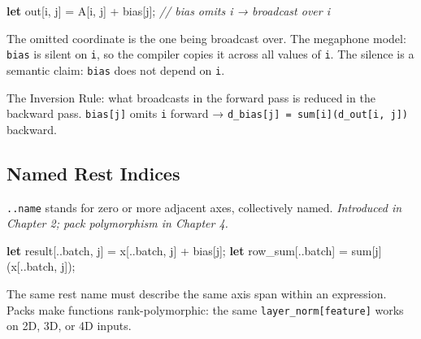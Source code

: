 \documentclass[11pt,titlepage]{article}
\newenvironment{Shaded}{}{}
\newcommand{\CommentTok}[1]{\textcolor[rgb]{0.38,0.63,0.69}{\textit{#1}}}
\newcommand{\KeywordTok}[1]{\textcolor[rgb]{0.00,0.44,0.13}{\textbf{#1}}}
\newcommand{\NormalTok}[1]{#1}
\newcommand{\OperatorTok}[1]{\textcolor[rgb]{0.40,0.40,0.40}{#1}}
\begin{document}
\begin{Shaded}
\begin{Highlighting}[]
\KeywordTok{let}\NormalTok{ out}\OperatorTok{[}\NormalTok{i, j}\OperatorTok{]}\NormalTok{ = A}\OperatorTok{[}\NormalTok{i, j}\OperatorTok{]}\NormalTok{ + bias}\OperatorTok{[}\NormalTok{j}\OperatorTok{]}\NormalTok{;   }\CommentTok{// bias omits i → broadcast over i}
\end{Highlighting}
\end{Shaded}

The omitted coordinate is the one being broadcast over. The megaphone
model: \texttt{bias} is silent on \texttt{i}, so the compiler copies it
across all values of \texttt{i}. The silence is a semantic claim:
\texttt{bias} does not depend on \texttt{i}.

The Inversion Rule: what broadcasts in the forward pass is reduced in
the backward pass. \texttt{bias{[}j{]}} omits \texttt{i} forward →
\texttt{d\_bias{[}j{]}\ =\ sum{[}i{]}(d\_out{[}i,\ j{]})} backward.

\vspace{2em}

\hypertarget{named-rest-indices}{%
\subsection{Named Rest Indices}\label{named-rest-indices}}

\texttt{..name} stands for zero or more adjacent axes, collectively
named. \emph{Introduced in Chapter 2; pack polymorphism in Chapter 4.}

\begin{Shaded}
\begin{Highlighting}[]
\KeywordTok{let}\NormalTok{ result}\OperatorTok{[}\NormalTok{..batch, j}\OperatorTok{]}\NormalTok{ = x}\OperatorTok{[}\NormalTok{..batch, j}\OperatorTok{]}\NormalTok{ + bias}\OperatorTok{[}\NormalTok{j}\OperatorTok{]}\NormalTok{;}
\KeywordTok{let}\NormalTok{ row_sum}\OperatorTok{[}\NormalTok{..batch}\OperatorTok{]}\NormalTok{ = sum}\OperatorTok{[}\NormalTok{j}\OperatorTok{]}\NormalTok{(x}\OperatorTok{[}\NormalTok{..batch, j}\OperatorTok{]}\NormalTok{);}
\end{Highlighting}
\end{Shaded}

The same rest name must describe the same axis span within an
expression. Packs make functions rank-polymorphic: the same
\texttt{layer\_norm{[}feature{]}} works on 2D, 3D, or 4D inputs.
\end{document}
